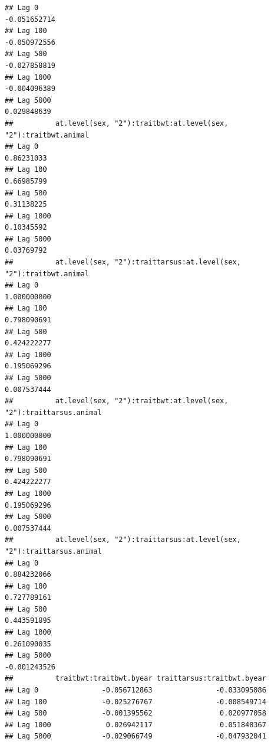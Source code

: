 \documentclass[
  12pt,
]{book}
\begin{document}
\begin{verbatim}
## Lag 0                                                            -0.051652714
## Lag 100                                                          -0.050972556
## Lag 500                                                          -0.027858819
## Lag 1000                                                         -0.004096389
## Lag 5000                                                          0.029848639
##          at.level(sex, "2"):traitbwt:at.level(sex, "2"):traitbwt.animal
## Lag 0                                                        0.86231033
## Lag 100                                                      0.66985799
## Lag 500                                                      0.31138225
## Lag 1000                                                     0.10345592
## Lag 5000                                                     0.03769792
##          at.level(sex, "2"):traittarsus:at.level(sex, "2"):traitbwt.animal
## Lag 0                                                          1.000000000
## Lag 100                                                        0.798090691
## Lag 500                                                        0.424222277
## Lag 1000                                                       0.195069296
## Lag 5000                                                       0.007537444
##          at.level(sex, "2"):traitbwt:at.level(sex, "2"):traittarsus.animal
## Lag 0                                                          1.000000000
## Lag 100                                                        0.798090691
## Lag 500                                                        0.424222277
## Lag 1000                                                       0.195069296
## Lag 5000                                                       0.007537444
##          at.level(sex, "2"):traittarsus:at.level(sex, "2"):traittarsus.animal
## Lag 0                                                             0.884232066
## Lag 100                                                           0.727789161
## Lag 500                                                           0.443591895
## Lag 1000                                                          0.261090035
## Lag 5000                                                         -0.001243526
##          traitbwt:traitbwt.byear traittarsus:traitbwt.byear
## Lag 0               -0.056712863               -0.033095086
## Lag 100             -0.025276767               -0.008549714
## Lag 500             -0.001395562                0.020977058
## Lag 1000             0.026942117                0.051848367
## Lag 5000            -0.029066749               -0.047932041

\end{verbatim}
\end{document}
